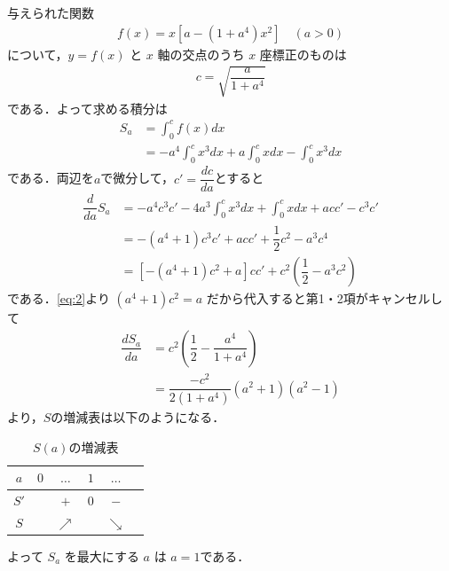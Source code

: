 \documentclass[../../main.tex]{subfiles}
\begin{document}
与えられた関数
\begin{align}
  f(x) = x[a - (1+a^4)x^2] \quad (a>0) \label{eq:1}
\end{align}
について，$y = f(x)$ と $x$ 軸の交点のうち $x$ 座標正のものは
\begin{align}
  c = \sqrt{\dfrac{a}{1+a^4}} \label{eq:2}
\end{align}
である．よって求める積分は
\begin{align}
  S_a
  &= \int_{0}^{c} f(x) dx \\
  &= -a^4 \int_0^c x^3 dx + a \int_0^c x dx - \int_0^c x^3 dx  \label{eq:3}
\end{align}
である．両辺を$a$で微分して，$c'=\dfrac{dc}{da}$とすると
\begin{align}
  \dfrac{d}{da} S_a
  &= -a^4 c^3 c' - 4a^3 \int_0^c x^3 dx + \int_0^c x dx + a c c' - c^3 c' \\
  &= -(a^4+1)c^3 c' + a c c' + \dfrac{1}{2}c^2 - a^3 c^4  \\
  &= \left[-(a^4+1)c^2 + a \right] cc' + c^2\left(\dfrac{1}{2}-a^3c^2\right)
\end{align}
である．\cref{eq:2}より $(a^4+1)c^2 = a$ だから代入すると第1・2項がキャンセルして
\begin{align}
  \dfrac{dS_a}{da}
  &= c^2 \left( \dfrac{1}{2} - \dfrac{a^4}{1+a^4} \right) \\
  &= \dfrac{-c^2}{2(1+a^4)} (a^2+1)(a^2-1)
\end{align}
より，$S$の増減表は以下のようになる．

\begin{table}[htb]
  \centering
  \caption{$S(a)$の増減表}
  \begin{tabular}{c|ccccc}
    $a$ & $0$ & $\dots$ & $1$ & $\dots$ \\ \hline
    $S'$ & & $+$ & $0$ & $-$ \\ \hline
    $S$ & & $\nearrow$ & & $\searrow$
  \end{tabular}
\end{table}

よって $S_a$ を最大にする $a$ は $a = 1$である．

\newpage
\end{document}
